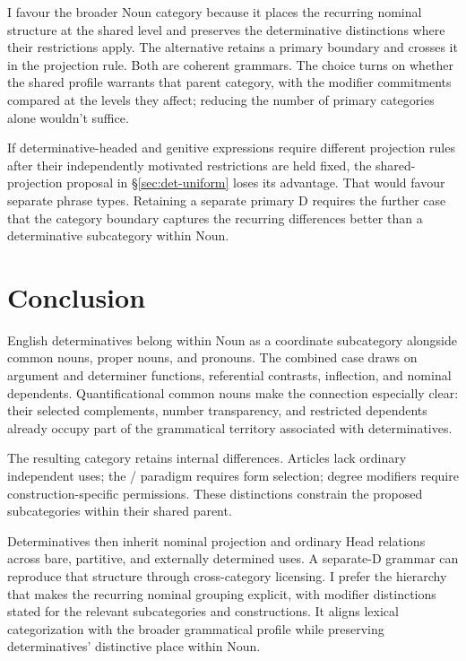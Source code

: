 \documentclass[12pt]{article}
\begin{document}
I favour the broader Noun category because it places the recurring nominal structure at the shared level and preserves the determinative distinctions where their restrictions apply. The alternative retains a primary boundary and crosses it in the projection rule. Both are coherent grammars. The choice turns on whether the shared profile warrants that parent category, with the modifier commitments compared at the levels they affect; reducing the number of primary categories alone wouldn't suffice.

If determinative-headed and genitive expressions require different projection rules after their independently motivated restrictions are held fixed, the shared-projection proposal in §\ref{sec:det-uniform} loses its advantage. That would favour separate phrase types. Retaining a separate primary D requires the further case that the category boundary captures the recurring differences better than a determinative subcategory within Noun.

\section{Conclusion}\label{sec:conclusion}

English determinatives belong within Noun as a coordinate subcategory alongside common nouns, proper nouns, and pronouns. The combined case draws on argument and determiner functions, referential contrasts, inflection, and nominal dependents. Quantificational common nouns make the connection especially clear: their selected complements, number transparency, and restricted dependents already occupy part of the grammatical territory associated with determinatives.

The resulting category retains internal differences. Articles lack ordinary independent uses; the /\allowbreak{} paradigm requires form selection; degree modifiers require construction-specific permissions. These distinctions constrain the proposed subcategories within their shared parent.

Determinatives then inherit nominal projection and ordinary Head relations across bare, partitive, and externally determined uses. A separate-D grammar can reproduce that structure through cross-category licensing. I prefer the hierarchy that makes the recurring nominal grouping explicit, with modifier distinctions stated for the relevant subcategories and constructions. It aligns lexical categorization with the broader grammatical profile while preserving determinatives' distinctive place within Noun.
\end{document}

